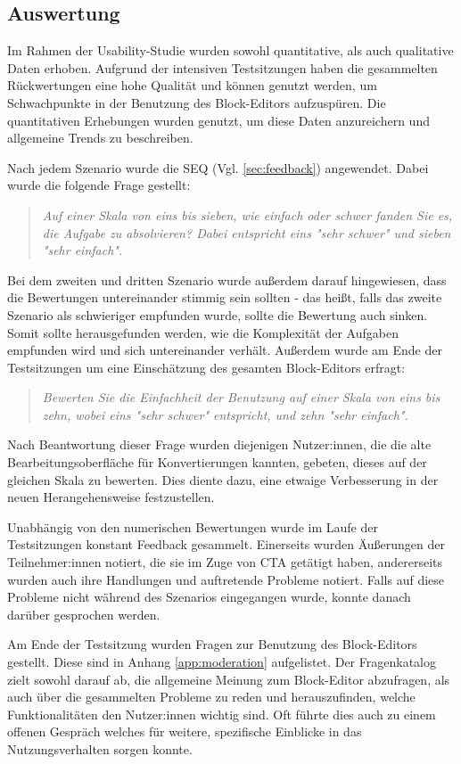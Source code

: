 \subsection{Auswertung}
Im Rahmen der Usability-Studie wurden sowohl quantitative, als auch qualitative Daten erhoben. Aufgrund der intensiven Testsitzungen haben die gesammelten Rückwertungen eine hohe Qualität und können genutzt werden, um Schwachpunkte in der Benutzung des Block-Editors aufzuspüren. Die quantitativen Erhebungen wurden genutzt, um diese Daten anzureichern und allgemeine Trends zu beschreiben.

Nach jedem Szenario wurde die \ac{SEQ} (Vgl. \ref{sec:feedback}) angewendet. Dabei wurde die folgende Frage gestellt:
\begin{quote}
  \textit{
    Auf einer Skala von eins bis sieben, wie einfach oder schwer fanden Sie es, die Aufgabe zu absolvieren? Dabei entspricht eins "sehr schwer" und sieben "sehr einfach".}
\end{quote}
Bei dem zweiten und dritten Szenario wurde außerdem darauf hingewiesen, dass die Bewertungen untereinander stimmig sein sollten - das heißt, falls das zweite Szenario als schwieriger empfunden wurde, sollte die Bewertung auch sinken. Somit sollte herausgefunden werden, wie die Komplexität der Aufgaben empfunden wird und sich untereinander verhält. Außerdem wurde am Ende der Testsitzungen um eine Einschätzung des gesamten Block-Editors erfragt:
\begin{quote}
  \textit{
    Bewerten Sie die Einfachheit der Benutzung auf einer Skala von eins bis zehn, wobei eins "sehr schwer" entspricht, und zehn "sehr einfach".
  }
\end{quote}
Nach Beantwortung dieser Frage wurden diejenigen Nutzer:innen, die die alte Bearbeitungsoberfläche für Konvertierungen kannten, gebeten, dieses auf der gleichen Skala zu bewerten. Dies diente dazu, eine etwaige Verbesserung in der neuen Herangehensweise festzustellen.

Unabhängig von den numerischen Bewertungen wurde im Laufe der Testsitzungen konstant Feedback gesammelt. Einerseits wurden Äußerungen der Teilnehmer:innen notiert, die sie im Zuge von \ac{CTA} getätigt haben, andererseits wurden auch ihre Handlungen und auftretende Probleme notiert. Falls auf diese Probleme nicht während des Szenarios eingegangen wurde, konnte danach darüber gesprochen werden.

Am Ende der Testsitzung wurden Fragen zur Benutzung des Block-Editors gestellt. Diese sind in Anhang \ref{app:moderation} aufgelistet. Der Fragenkatalog zielt sowohl darauf ab, die allgemeine Meinung zum Block-Editor abzufragen, als auch über die gesammelten Probleme zu reden und herauszufinden, welche Funktionalitäten den Nutzer:innen wichtig sind. Oft führte dies auch zu einem offenen Gespräch welches für weitere, spezifische Einblicke in das Nutzungsverhalten sorgen konnte.
